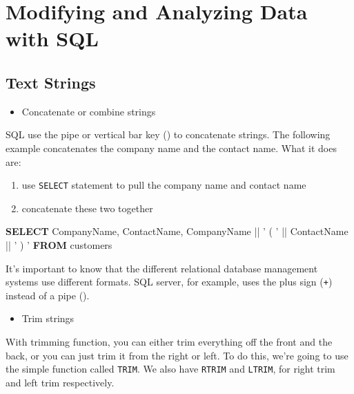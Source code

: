 \documentclass[]{book}
\newenvironment{Shaded}{\begin{snugshade}}{\end{snugshade}}
\newcommand{\KeywordTok}[1]{\textcolor[rgb]{0.13,0.29,0.53}{\textbf{{#1}}}}
\newcommand{\StringTok}[1]{\textcolor[rgb]{0.31,0.60,0.02}{{#1}}}
\newcommand{\NormalTok}[1]{{#1}}
\providecommand{\tightlist}{%
  \setlength{\itemsep}{0pt}\setlength{\parskip}{0pt}}
\theoremstyle{definition}
\theoremstyle{definition}
\theoremstyle{remark}
\begin{document}
\chapter{Modifying and Analyzing Data with
SQL}\label{modifying-and-analyzing-data-with-sql}

\section{Text Strings}\label{text-strings}

\begin{itemize}
\tightlist
\item
  Concatenate or combine strings
\end{itemize}

SQL use the pipe or vertical bar key (\texttt{\textbar{}\textbar{}}) to
concatenate strings. The following example concatenates the company name
and the contact name. What it does are:

\begin{enumerate}
\def\labelenumi{\arabic{enumi}.}
\tightlist
\item
  use \texttt{SELECT} statement to pull the company name and contact
  name
\item
  concatenate these two together
\end{enumerate}

\begin{Shaded}
\begin{Highlighting}[]
\KeywordTok{SELECT}
\NormalTok{CompanyName, ContactName, CompanyName || }\StringTok{'  ( '} \NormalTok{|| ContactName || }\StringTok{' ) '}
\KeywordTok{FROM} \NormalTok{customers}
\end{Highlighting}
\end{Shaded}

It's important to know that the different relational database management
systems use different formats. SQL server, for example, uses the plus
sign (\texttt{+}) instead of a pipe (\texttt{\textbar{}\textbar{}}).

\begin{itemize}
\tightlist
\item
  Trim strings
\end{itemize}

With trimming function, you can either trim everything off the front and
the back, or you can just trim it from the right or left. To do this,
we're going to use the simple function called \texttt{TRIM}. We also
have \texttt{RTRIM} and \texttt{LTRIM}, for right trim and left trim
respectively.
\end{document}
